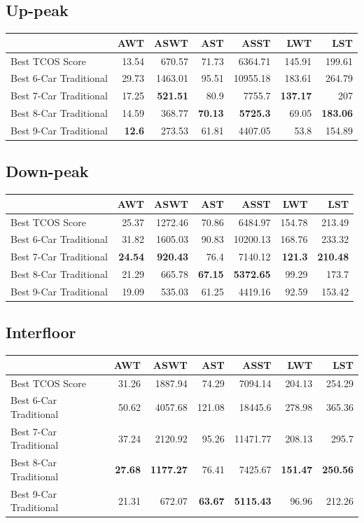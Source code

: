 \documentclass{UoYCSproject}
\begin{document}
\subsection{Up-peak}
\begin{tabular}{l | r r r r r r}
    & AWT & ASWT & AST & ASST & LWT & LST \\
	\hline
    Best TCOS Score & 13.54 & 670.57 & 71.73 & 6364.71 & 145.91 & 199.61 \\
	\hline
    Best 6-Car Traditional & 29.73 & 1463.01 & 95.51 & 10955.18 & 183.61 & 264.79 \\
    Best 7-Car Traditional & 17.25 & \textbf{521.51} & 80.9 & 7755.7 & \textbf{137.17} & 207 \\
    Best 8-Car Traditional & 14.59 & 368.77 & \textbf{70.13} & \textbf{5725.3} & 69.05 & \textbf{183.06} \\
    Best 9-Car Traditional & \textbf{12.6} & 273.53 & 61.81 & 4407.05 & 53.8 & 154.89
\end{tabular}

\subsection{Down-peak}
\begin{tabular}{l | r r r r r r}
    & AWT & ASWT & AST & ASST & LWT & LST \\
	\hline
    Best TCOS Score & 25.37 & 1272.46 & 70.86 & 6484.97 & 154.78 & 213.49 \\
	\hline
    Best 6-Car Traditional & 31.82 & 1605.03 & 90.83 & 10200.13 & 168.76 & 233.32 \\
    Best 7-Car Traditional & \textbf{24.54} & \textbf{920.43} & 76.4 & 7140.12 & \textbf{121.3} & \textbf{210.48} \\
    Best 8-Car Traditional & 21.29 & 665.78 & \textbf{67.15} & \textbf{5372.65} & 99.29 & 173.7 \\
    Best 9-Car Traditional & 19.09 & 535.03 & 61.25 & 4419.16 & 92.59 & 153.42
\end{tabular}

\subsection{Interfloor}
\begin{tabular}{l | r r r r r r}
    & AWT & ASWT & AST & ASST & LWT & LST \\
	\hline
    Best TCOS Score & 31.26 & 1887.94 & 74.29 & 7094.14 & 204.13 & 254.29 \\
	\hline
    Best 6-Car Traditional & 50.62 & 4057.68 & 121.08 & 18445.6 & 278.98 & 365.36 \\
    Best 7-Car Traditional & 37.24 & 2120.92 & 95.26 & 11471.77 & 208.13 & 295.7 \\
    Best 8-Car Traditional & \textbf{27.68} & \textbf{1177.27} & 76.41 & 7425.67 & \textbf{151.47} & \textbf{250.56} \\
    Best 9-Car Traditional & 21.31 & 672.07 & \textbf{63.67} & \textbf{5115.43} & 96.96 & 212.26
\end{tabular}
\end{document}
